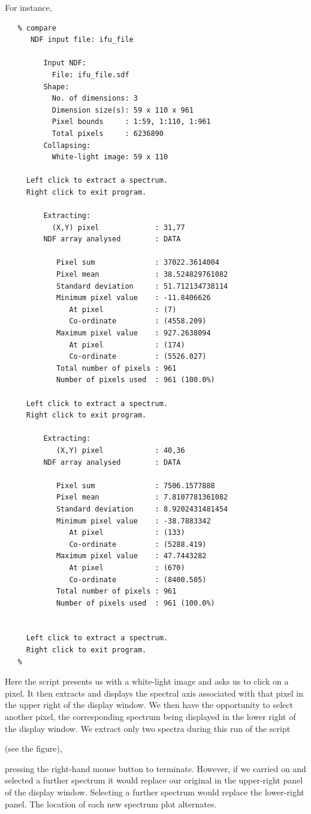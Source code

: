 \documentclass[twoside,11pt]{article}
\begin{document}
{For instance,

\small\begin{verbatim}
   % compare
      NDF input file: ifu_file
    
         Input NDF:
           File: ifu_file.sdf
         Shape:
           No. of dimensions: 3
           Dimension size(s): 59 x 110 x 961
           Pixel bounds     : 1:59, 1:110, 1:961
           Total pixels     : 6236890
         Collapsing:
           White-light image: 59 x 110
 
     Left click to extract a spectrum.
     Right click to exit program.
 
         Extracting:
           (X,Y) pixel             : 31,77
         NDF array analysed        : DATA

            Pixel sum              : 37022.3614004
            Pixel mean             : 38.524829761082
            Standard deviation     : 51.712134738114
            Minimum pixel value    : -11.8406626
               At pixel            : (7)
               Co-ordinate         : (4558.209)
            Maximum pixel value    : 927.2638094
               At pixel            : (174)
               Co-ordinate         : (5526.027)
            Total number of pixels : 961
            Number of pixels used  : 961 (100.0%)

     Left click to extract a spectrum.
     Right click to exit program.
 
         Extracting:
            (X,Y) pixel            : 40,36
         NDF array analysed        : DATA

            Pixel sum              : 7506.1577888
            Pixel mean             : 7.8107781361082
            Standard deviation     : 8.9202431481454
            Minimum pixel value    : -38.7883342
               At pixel            : (133)
               Co-ordinate         : (5288.419)
            Maximum pixel value    : 47.7443282
               At pixel            : (670)
               Co-ordinate         : (8400.505)
            Total number of pixels : 961
            Number of pixels used  : 961 (100.0%)


     Left click to extract a spectrum.
     Right click to exit program.
   %
\end{verbatim}\normalsize

Here the script presents us with a white-light image and asks us to
click on a pixel.  It then extracts and displays the spectral axis
associated with that pixel in the upper right of the display window.
We then have the opportunity to select another pixel, the
corresponding spectrum being displayed in the lower right of the
display window.  We extract only two spectra during this run of the
script 
\begin{htmlonly}
(see the figure),
\end{htmlonly}
 pressing the right-hand mouse
button to terminate.  However, if we carried on and selected a further
spectrum it would replace our original in the upper-right panel of the
display window.  Selecting a further spectrum would replace the
lower-right panel.  The location of each new spectrum plot alternates.

}
\end{document}
